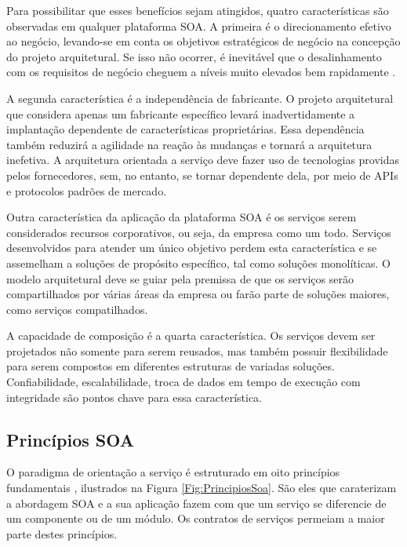 Para possibilitar que esses benefícios sejam atingidos, quatro características
são observadas em qualquer plataforma SOA. A primeira é o direcionamento
efetivo ao negócio, levando-se em conta os objetivos estratégicos de negócio na
concepção do projeto arquitetural. Se isso não ocorrer, é inevitável que o
desalinhamento com os requisitos de negócio cheguem a níveis muito elevados
bem rapidamente \cite{erl2008soaDesigPatterns}.

A segunda característica é a independência de fabricante. O projeto arquitetural
que considera apenas um fabricante específico levará inadvertidamente a
implantação dependente de características proprietárias. Essa dependência também
reduzirá a agilidade na reação às mudanças e tornará a arquitetura inefetiva. A
arquitetura orientada a serviço deve fazer uso de tecnologias providas pelos
fornecedores, sem, no entanto, se tornar dependente dela, por meio de APIs e
protocolos padrões de mercado.

Outra característica da aplicação da plataforma SOA é os serviços serem
considerados recursos corporativos, ou seja, da empresa como um todo. Serviços
desenvolvidos para atender um único objetivo perdem esta característica e se
assemelham a soluções de propósito específico, tal como soluções monolíticas. O
modelo arquitetural deve se guiar pela premissa de que os serviços serão
compartilhados por várias áreas da empresa ou farão parte de soluções maiores,
como serviços compatilhados.

A capacidade de composição é a quarta característica. Os serviços devem ser
projetados não somente para serem reusados, mas também possuir
flexibilidade para serem compostos em diferentes estruturas de variadas
soluções. Confiabilidade, escalabilidade, troca de dados em tempo de execução
com integridade são pontos chave para essa característica.



\subsection{Princípios SOA}
\label{PrincipiosSOA} 
\vspace{-6mm}

O paradigma de orientação a serviço é estruturado em oito princípios
fundamentais \cite{erl2009web}, ilustrados na Figura \ref{Fig:PrincipiosSoa}. São eles que
caraterizam a abordagem SOA e a sua aplicação fazem com que um serviço se diferencie de um componente ou de
um módulo. Os contratos de serviços permeiam a maior parte destes princípios.


